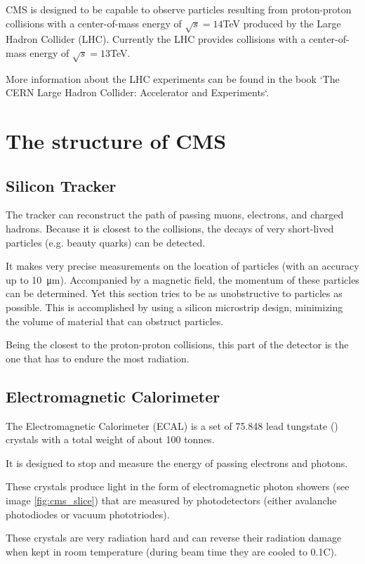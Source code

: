CMS is designed to be capable to observe particles resulting from proton-proton
collisions with a center-of-mass energy of $\sqrt{s} = 14$TeV produced by the
Large Hadron Collider (LHC).
Currently the LHC provides collisions with a center-of-mass energy of
$\sqrt{s} = 13$TeV.

More information about the LHC experiments can be found in the book
`The CERN Large Hadron Collider: Accelerator and Experiments`\cite{CMS_Experiment}.

\section{The structure of CMS}
\subsection{Silicon Tracker}
The tracker can reconstruct the path of passing muons, electrons, and charged
hadrons. Because it is closest to the collisions, the decays of very short-lived particles (e.g.
beauty quarks)\cite{aboutCMS} can be detected.

It makes very precise measurements on the location of particles (with an accuracy
up to \SI{10}{\micro\meter}). Accompanied by a magnetic field, the momentum of
these particles can be determined.
Yet this section tries to be as unobstructive to particles as possible. This is
accomplished by using a silicon microstrip design, minimizing the volume of material that
can obstruct particles.

Being the closest to the proton-proton collisions, this part of the detector is
the one that has to endure the most radiation.
\subsection{Electromagnetic Calorimeter}
The Electromagnetic Calorimeter (ECAL) is a set of 75.848 lead tungstate () crystals
with a total weight of about 100 tonnes.

It is designed to stop and measure the energy of passing electrons and photons.

These crystals produce light in the form of electromagnetic photon showers (see image \ref{fig:cms_slice})
that are measured by photodetectors (either avalanche photodiodes or vacuum phototriodes).

These crystals are very radiation hard and can reverse their radiation damage when
kept in room temperature (during beam time they are cooled to 0.1\degree C).
